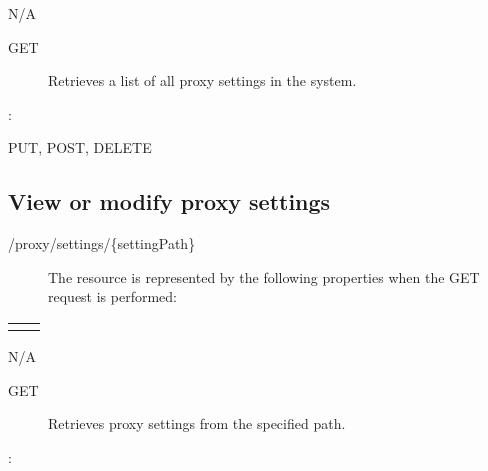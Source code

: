 \documentclass[letterpaper,10pt,english]{sphinxmanual}
\begin{document}
 N/A
\begin{description}
\item[{ GET}] \leavevmode
Retrieves a list of all proxy settings in the system.

\end{description}

:

\begin{sphinxVerbatim}[commandchars=\\\{\}]
\end{sphinxVerbatim}

 PUT, POST, DELETE


\subsection{View or modify proxy settings}
\label{\detokenize{restapi:view-or-modify-proxy-settings}}
 /proxy/settings/\{settingPath\}
\begin{description}
\item[{}] \leavevmode
The resource is represented by the following properties when the GET request is performed:

\end{description}


\begin{savenotes}\sphinxattablestart
\centering
\begin{tabulary}{\linewidth}[t]{|T|T|}
\hline

&
\\
\hline&\\
\hline
\end{tabulary}
\par
\sphinxattableend\end{savenotes}

 N/A
\begin{description}
\item[{ GET}] \leavevmode
Retrieves proxy settings from the specified path.

\end{description}

:
\end{document}

